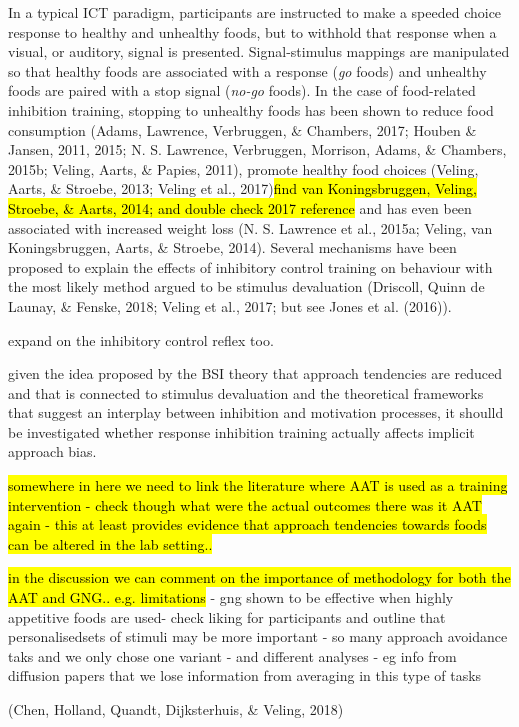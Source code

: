 \documentclass[man,floatsintext]{apa6}
\begin{document}
In a typical ICT paradigm, participants are instructed to make a speeded
choice response to healthy and unhealthy foods, but to withhold that
response when a visual, or auditory, signal is presented.
Signal-stimulus mappings are manipulated so that healthy foods are
associated with a response (\textit{go} foods) and unhealthy foods are
paired with a stop signal (\textit{no-go} foods). In the case of
food-related inhibition training, stopping to unhealthy foods has been
shown to reduce food consumption (Adams, Lawrence, Verbruggen, \&
Chambers, 2017; Houben \& Jansen, 2011, 2015; N. S. Lawrence,
Verbruggen, Morrison, Adams, \& Chambers, 2015b; Veling, Aarts, \&
Papies, 2011), promote healthy food choices (Veling, Aarts, \& Stroebe,
2013; Veling et al.,
2017)\hl{find van Koningsbruggen, Veling, Stroebe, \& Aarts, 2014; and double check 2017 reference}
and has even been associated with increased weight loss (N. S. Lawrence
et al., 2015a; Veling, van Koningsbruggen, Aarts, \& Stroebe, 2014).
Several mechanisms have been proposed to explain the effects of
inhibitory control training on behaviour with the most likely method
argued to be stimulus devaluation (Driscoll, Quinn de Launay, \& Fenske,
2018; Veling et al., 2017; but see Jones et al. (2016)).

expand on the inhibitory control reflex too.

given the idea proposed by the BSI theory that approach tendencies are
reduced and that is connected to stimulus devaluation and the
theoretical frameworks that suggest an interplay between inhibition and
motivation processes, it shoulld be investigated whether response
inhibition training actually affects implicit approach bias.

\hl{somewhere in here we need to link the literature where AAT is used as a training intervention - check though what were the actual outcomes there was it AAT again - this at least provides evidence that approach tendencies towards foods can be altered in the lab setting..}

\hl{in the discussion we can comment on the importance of methodology for both the AAT and GNG.. e.g. limitations}
- gng shown to be effective when highly appetitive foods are used- check
liking for participants and outline that personalisedsets of stimuli may
be more important - so many approach avoidance taks and we only chose
one variant - and different analyses - eg info from diffusion papers
that we lose information from averaging in this type of tasks

(Chen, Holland, Quandt, Dijksterhuis, \& Veling, 2018)
\end{document}
